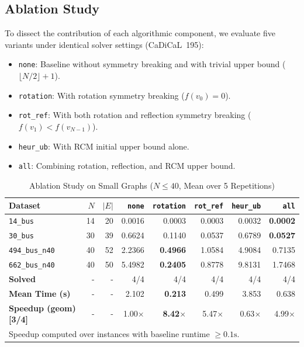 \documentclass[a4paper,fleqn]{cas-sc}
\begin{document}
\subsection{Ablation Study}
To dissect the contribution of each algorithmic component, we evaluate five variants under identical solver settings (CaDiCaL~195):
\begin{itemize}
    \item \texttt{none}: Baseline without symmetry breaking and with trivial upper bound ($\lfloor N/2 \rfloor + 1$).
    \item \texttt{rotation}: With rotation symmetry breaking ($f(v_0) = 0$).
    \item \texttt{rot\_ref}: With both rotation and reflection symmetry breaking ($f(v_1) < f(v_{N-1})$).
    \item \texttt{heur\_ub}: With RCM initial upper bound alone.
    \item \texttt{all}: Combining rotation, reflection, and RCM upper bound.
\end{itemize}

\begin{table}
\centering
\caption{Ablation Study on Small Graphs ($N \le 40$, Mean over 5 Repetitions)}
\label{tab:table_ablation_small}
\begin{tabular}{lrrrrrrr}
\toprule
Dataset & $N$ & $|E|$ & \texttt{none} & \texttt{rotation} & \texttt{rot\_ref} & \texttt{heur\_ub} & \texttt{all} \\
\midrule
\texttt{14\_bus} & 14 & 20 & 0.0016 & 0.0003 & 0.0003 & 0.0032 & \textbf{0.0002} \\
\texttt{30\_bus} & 30 & 39 & 0.6624 & 0.1140 & 0.0537 & 0.6789 & \textbf{0.0527} \\
\texttt{494\_bus\_n40} & 40 & 52 & 2.2366 & \textbf{0.4966} & 1.0584 & 4.9084 & 0.7135 \\
\texttt{662\_bus\_n40} & 40 & 50 & 5.4982 & \textbf{0.2405} & 0.8778 & 9.8131 & 1.7468 \\
\midrule
\textbf{Solved} & - & - & 4/4 & 4/4 & 4/4 & 4/4 & 4/4 \\
\textbf{Mean Time (s)} & - & - & 2.102 & \textbf{0.213} & 0.499 & 3.853 & 0.638 \\
\textbf{Speedup (geom) [3/4]} & - & - & 1.00$\times$ & \textbf{8.42$\times$} & 5.47$\times$ & 0.63$\times$ & 4.99$\times$ \\
\bottomrule
\multicolumn{8}{l}{\footnotesize Speedup computed over instances with baseline runtime $\ge 0.1\text{s}$.} \\
\end{tabular}
\end{table}
\end{document}
